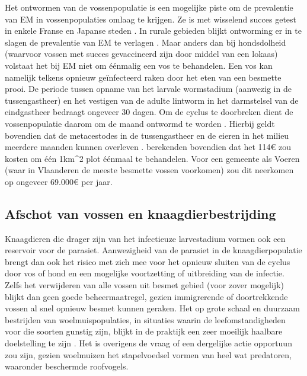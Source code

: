 \documentclass[twoside]{extreport}
\begin{document}
Het ontwormen van de vossenpopulatie is een mogelijke piste om de
prevalentie van EM in vossenpopulaties omlaag te krijgen. Ze is met
wisselend succes getest in enkele Franse en Japanse steden
\citep{comte2013fox, inoue2007use}. In rurale gebieden blijkt ontworming
er in te slagen de prevalentie van EM te verlagen
\citep{schelling1997chemotherapy, tackmann2001field}. Maar anders dan
bij hondsdolheid (waarvoor vossen met succes gevaccineerd zijn door
middel van een lokaas) volstaat het bij EM niet om éénmalig een vos te
behandelen. Een vos kan namelijk telkens opnieuw geïnfecteerd raken door
het eten van een besmette prooi. De periode tussen opname van het
larvale wormstadium (aanwezig in de tussengastheer) en het vestigen van
de adulte lintworm in het darmstelsel van de eindgastheer bedraagt
ongeveer 30 dagen. Om de cyclus te doorbreken dient de vossenpopulatie
daarom om de maand ontwormd te worden \citep{craig2017echinococcosis}.
Hierbij geldt bovendien dat de metacestodes in de tussengastheer en de
eieren in het milieu meerdere maanden kunnen overleven
\citep{veit1995influence}. \citet{comte2013fox} berekenden bovendien dat
het 114\euro{} zou kosten om één 1km\^{}2 plot éénmaal te behandelen.
Voor een gemeente als Voeren (waar in Vlaanderen de meeste besmette
vossen voorkomen) zou dit neerkomen op ongeveer 69.000\euro{} per jaar.

\subsection{Afschot van vossen en
knaagdierbestrijding}\label{afschot-van-vossen-en-knaagdierbestrijding}

Knaagdieren die drager zijn van het infectieuze larvestadium vormen ook
een reservoir voor de parasiet. Aanwezigheid van de parasiet in de
knaagdierpopulatie brengt dan ook het risico met zich mee voor het
opnieuw sluiten van de cyclus door vos of hond en een mogelijke
voortzetting of uitbreiding van de infectie. Zelfs het verwijderen van
alle vossen uit besmet gebied (voor zover mogelijk) blijkt dan geen
goede beheermaatregel, gezien immigrerende of doortrekkende vossen al
snel opnieuw besmet kunnen geraken. Het op grote schaal en duurzaam
bestrijden van woelmuispopulaties, in situaties waarin de
leefomstandigheden voor die soorten gunstig zijn, blijkt in de praktijk
een zeer moeilijk haalbare doelstelling te zijn
\citep{singleton2010rodent}. Het is overigens de vraag of een dergelijke
actie opportuun zou zijn, gezien woelmuizen het stapelvoedsel vormen van
heel wat predatoren, waaronder beschermde roofvogels.
\end{document}
